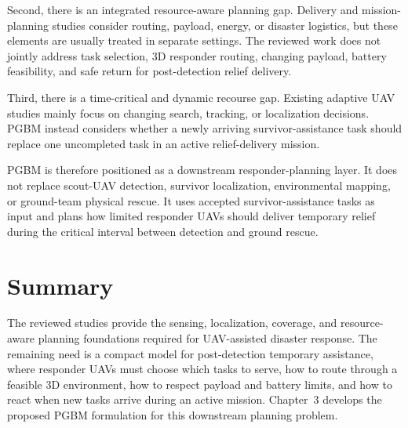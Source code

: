 Second, there is an integrated resource-aware planning gap. Delivery and
mission-planning studies consider routing, payload, energy, or disaster
logistics, but these elements are usually treated in separate settings. The
reviewed work does not jointly address task selection, 3D responder routing,
changing payload, battery feasibility, and safe return for post-detection
relief delivery.

Third, there is a time-critical and dynamic recourse gap. Existing adaptive UAV
studies mainly focus on changing search, tracking, or localization decisions.
PGBM instead considers whether a newly arriving survivor-assistance task should
replace one uncompleted task in an active relief-delivery mission.

PGBM is therefore positioned as a downstream responder-planning layer. It does
not replace scout-UAV detection, survivor localization, environmental mapping,
or ground-team physical rescue. It uses accepted survivor-assistance tasks as
input and plans how limited responder UAVs should deliver temporary relief
during the critical interval between detection and ground rescue.

\section{Summary}
\label{sec_related_summary}

The reviewed studies provide the sensing, localization, coverage, and
resource-aware planning foundations required for UAV-assisted disaster
response. The remaining need is a compact model for post-detection temporary
assistance, where responder UAVs must choose which tasks to serve, how to route
through a feasible 3D environment, how to respect payload and battery limits,
and how to react when new tasks arrive during an active mission. Chapter~3
develops the proposed PGBM formulation for this downstream planning problem.

